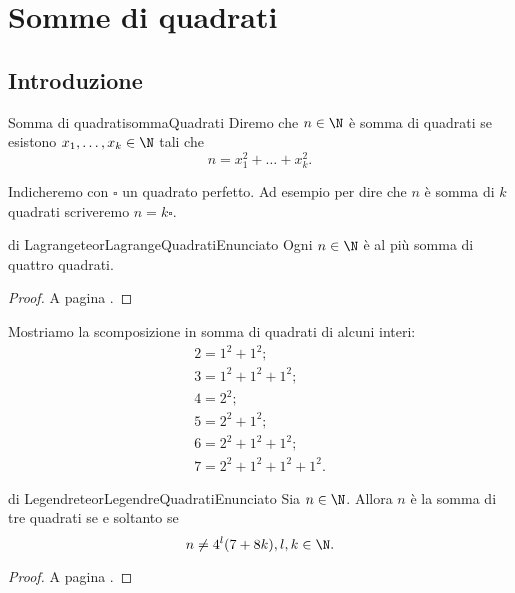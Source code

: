 \chapter{Somme di quadrati}
%
%
\section{Introduzione}

\begin{defn}{Somma di quadrati}{sommaQuadrati}
	Diremo che \(n\in\N\) è somma di quadrati se esistono \(x_1,\ldots,x_k\in\N\) tali che
	\[
		n = x_1^2 + \ldots + x_k^2.
	\]
\end{defn}

\begin{notz}
	Indicheremo con \(\square\) un quadrato perfetto.
	Ad esempio per dire che \(n\) è somma di \(k\) quadrati scriveremo \(n=k\square\).
\end{notz}

\begin{teor}{di Lagrange}{teorLagrangeQuadratiEnunciato}
	Ogni \(n\in\N\) è al più somma di quattro quadrati.
\end{teor}

\begin{proof}
	A pagina \pageref{th:teorLagrangeQuadrati}.
\end{proof}

\begin{ese}
	Mostriamo la scomposizione in somma di quadrati di alcuni interi:
	\begin{gather*}
		2=1^2+1^2;\\
		3=1^2+1^2+1^2;\\
		4=2^2;\\
		5=2^2+1^2;\\
		6=2^2+1^2+1^2;\\
		7=2^2+1^2+1^2+1^2.
	\end{gather*}
\end{ese}

\begin{teor}{di Legendre}{teorLegendreQuadratiEnunciato}
	Sia \(n\in\N\).
	Allora \(n\) è la somma di tre quadrati se e soltanto se
	\[
		n \neq 4^l (7+8k),l,k\in\N.
	\]
\end{teor}

\begin{proof}
	A pagina \pageref{th:teorLegendreQuadrati}.
\end{proof}


